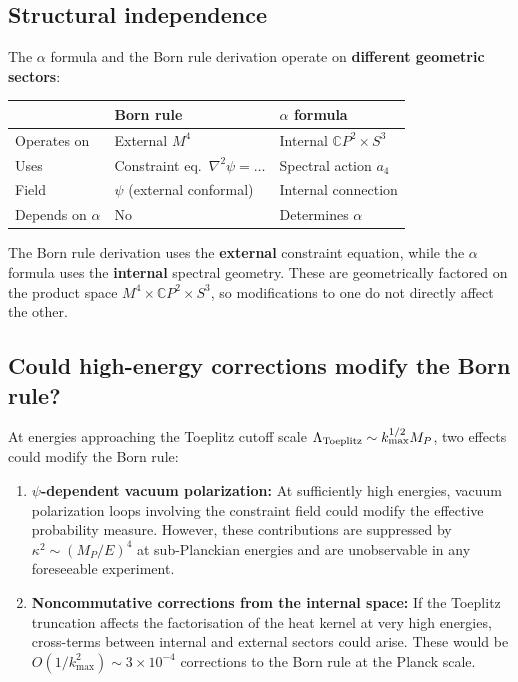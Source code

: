 \documentclass[12pt,a4paper]{article}
\newcommand{\CP}{\mathbb{C}P}
\begin{document}
\subsection{Structural independence}

The $\alpha$ formula and the Born rule derivation operate on \textbf{different geometric sectors}:

\begin{center}
\begin{tabular}{lll}
\toprule
& \textbf{Born rule} & \textbf{$\alpha$ formula} \\
\midrule
Operates on & External $M^4$ & Internal $\CP^2 \times S^3$ \\
Uses & Constraint eq.\ $\nabla^2\psi = \ldots$ & Spectral action $a_4$ \\
Field & $\psi$ (external conformal) & Internal connection \\
Depends on $\alpha$ & No & Determines $\alpha$ \\
\bottomrule
\end{tabular}
\end{center}

The Born rule derivation uses the \textbf{external} constraint equation, while the $\alpha$ formula uses the \textbf{internal} spectral geometry. These are geometrically factored on the product space $M^4 \times \CP^2 \times S^3$, so modifications to one do not directly affect the other.

\subsection{Could high-energy corrections modify the Born rule?}

At energies approaching the Toeplitz cutoff scale $\Lambda_{\rm Toeplitz} \sim k_{\max}^{1/2} M_P$, two effects could modify the Born rule:

\begin{enumerate}
\item \textbf{$\psi$-dependent vacuum polarization:} At sufficiently high energies, vacuum polarization loops involving the constraint field could modify the effective probability measure. However, these contributions are suppressed by $\kappa^2 \sim (M_P/E)^4$ at sub-Planckian energies and are unobservable in any foreseeable experiment.

\item \textbf{Noncommutative corrections from the internal space:} If the Toeplitz truncation affects the factorisation of the heat kernel at very high energies, cross-terms between internal and external sectors could arise. These would be $O(1/k_{\max}^2) \sim 3 \times 10^{-4}$ corrections to the Born rule at the Planck scale.
\end{enumerate}
\end{document}
